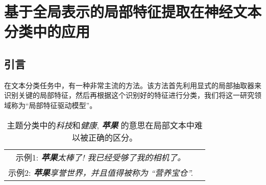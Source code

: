 \chapter{基于全局表示的局部特征提取在神经文本分类中的应用}

\section{引言}
在文本分类任务中，有一种非常主流的方法。该方法首先利用显式的局部抽取器来识别关键的局部特征，然后再根据这个识别好的特征进行分类，我们将这一研究领域称为``局部特征驱动模型''。

\begin{table}[p]
  \begin{center}
    \begin{tabular}{c c}
    \toprule
    示例1: \emph{\textbf{苹果}太棒了! 我已经受够了我的相机了。}\\
	示例2: \emph{\textbf{苹果}享誉世界，并且值得被称为 ``营养宝仓''.}\\
    \bottomrule
    \end{tabular}
  \end{center}
  \caption{主题分类中的\emph{科技}和\emph{健康}, \emph{\textbf{苹果}} 的意思在局部文本中难以被正确的区分。}
\label{tab: case}
\end{table}